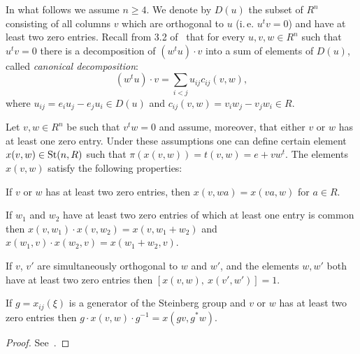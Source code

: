 In what follows we assume $n \geq 4$.
We denote by $D(u)$ the subset of $R^n$ consisting of all columns $v$ which are orthogonal to $u$
(i.\,e. $u^{t} v = 0$) and have at least two zero entries.
Recall from 3.2 of~\cite{Ka77} that for every $u, v, w \in R^n$ such that $u^t v = 0$ there
is a decomposition of $(w^t u) \cdot v$ into a sum of elements of $D(u)$, called \textit{canonical decomposition}:
\begin{equation}
    \label{eq:canonical} (w^tu) \cdot v=\sum_{i<j}u_{ij} c_{ij}(v, w),
\end{equation}
where $u_{ij} =e_i u_j-e_j u_i \in D(u)$ and $c_{ij}(v, w) =v_i w_j-v_j w_i \in R$.

\begin{lemma}
    \label{lem:xsmall-properties}
    Let $v, w \in R^n$ be such that $v^t w = 0$ and assume, moreover, that either $v$ or $w$ has at least one zero entry.
    Under these assumptions one can define certain element $x(v, w) \in \operatorname{St}(n, R)$ such that $\pi(x(v, w)) = t(v, w) = e + vw^t$.
    The elements $x(v, w)$ satisfy the following properties:
    \begin{lemlist}
        \item \label{itm:xsmall-scalar} If $v$ or $w$ has at least two zero entries, then $x(v, wa) = x(va, w)$ for $a\in R$.
        \item \label{itm:xsmall-additivity} If $w_1$ and $w_2$ have at least two zero entries of which at least one entry is common
        then $x(v, w_1) \cdot x(v, w_2) = x(v, w_1+w_2)$ and $x(w_1, v) \cdot x(w_2, v) = x(w_1 + w_2, v)$.
        \item \label{itm:xsmall-commute} If $v$, $v'$ are simultaneously orthogonal to $w$ and $w'$, and the elements $w, w'$ both have at least two zero entries then
        $[x(v, w),\ x(v', w')] = 1$.
        \item \label{itm:xsmall-conj} If $g = x_{ij}(\xi)$ is a generator of the Steinberg group and $v$ or $w$ has at least two zero entries then
        $g \cdot x(v, w) \cdot g^{-1} = x(gv, g^*w)$.
    \end{lemlist}
\end{lemma}
\begin{proof}
    See~\cite[Lemma~1.1]{Tu83}.
\end{proof}

